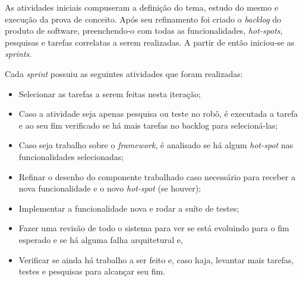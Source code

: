 As atividades iniciais compuseram a definição do tema, estudo do mesmo e execução da prova de conceito. Após seu refinamento foi criado o \textit{backlog} do produto de software, preenchendo-o com todas as funcionalidades, \textit{hot-spots}, pesquisas e tarefas correlatas a serem realizadas. A partir de então iniciou-se as \textit{sprints}.

Cada \textit{sprint} possuiu as seguintes atividades que foram realizadas: 
\begin{itemize}
  \item Selecionar as tarefas a serem feitas nesta iteração;
  \item Caso a atividade seja apenas pesquisa ou teste no robô, é executada a tarefa e ao seu fim verificado se há mais tarefas no backlog para selecioná-las;
  \item Caso seja trabalho sobre o \textit{framework}, é analisado se há algum \textit{hot-spot} nas funcionalidades selecionadas;
  \item Refinar o desenho do componente trabalhado caso necessário para receber a nova funcionalidade e o novo \textit{hot-spot} (se houver);
  \item Implementar a funcionalidade nova e rodar a suíte de testes;
  \item Fazer uma revisão de todo o sistema para ver se está evoluindo para o fim esperado e se há alguma falha arquitetural e,
  \item Verificar se ainda há trabalho a ser feito e, caso haja, levantar mais tarefas, testes e pesquisas para alcançar seu fim.
\end{itemize} 

\newpage

